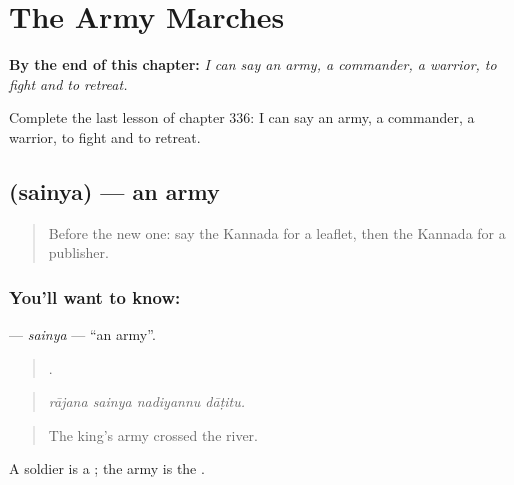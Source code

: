 
\chapter{The Army Marches}
\label{ch:ka-the-army-marches}

\begin{chapteropening}
\textbf{By the end of this chapter:} \emph{I can say an army, a commander, a warrior, to fight and to retreat.}

Complete the last lesson of chapter 336: I can say an army, a commander, a warrior, to fight and to retreat.
\end{chapteropening}

\section[\texorpdfstring{\kn{ಸೈನ್ಯ} (sainya)}{ಸೈನ್ಯ (sainya)}]{ (sainya) — an army}

\label{lesson:KA-C336-sainya}



\begin{quote}
Before the new one: say the Kannada for a leaflet, then the Kannada for a publisher.
\end{quote}

\subsection*{You'll want to know: }
\textbf{} — \emph{sainya} — \textquotedblleft{}an army\textquotedblright{}.

\begin{quote}
   .
\end{quote}

\begin{quote}
\emph{rājana sainya nadiyannu dāṭitu.}
\end{quote}

\begin{quote}
The king's army crossed the river.
\end{quote}

A soldier is a ; the army is the .

